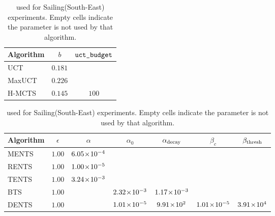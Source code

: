     \begin{table}[tbp]
        \centering
        \begin{subtable}{\textwidth}
            \centering
            \begin{tabular}{l|c|c}
                Algorithm & $b$ & ${\texttt{uct\_budget}}$ \\
                \hline
                UCT     & $0.181$ & \\
                MaxUCT  & $0.226$ & \\
                H-MCTS  & $0.145$ & $100$ \\
            \end{tabular}
            \caption{UCT-based search algorithms.}
        \end{subtable}
    
        \vspace{1em}
    
            {%
            \setlength{\tabcolsep}{4pt}%
            \fontsize{12}{14.5}\selectfont
        \begin{subtable}{\textwidth}
            \centering
            \begin{tabular}{l|c|c|c|c|c|c}
                Algorithm
                    & $\epsilon$
                    & $\alpha$
                    & $\alpha_0$
                    & ${\alpha_{\text{decay}}}$
                    & $\beta_c$
                    & ${\beta_{\text{thresh}}}$ \\
                \hline
                MENTS & $1.00$ & $6.05\!\times\!10^{-4}$ & & & & \\
                RENTS & $1.00$ & $1.00\!\times\!10^{-5}$ & & & & \\
                TENTS & $1.00$ & $3.24\!\times\!10^{-3}$ & & & & \\
                BTS   & $1.00$ & & $2.32\!\times\!10^{-3}$ & $1.17\!\times\!10^{-3}$ & & \\
                DENTS & $1.00$ & & $1.01\!\times\!10^{-5}$ & $9.91\!\times\!10^{2}$ 
                    & $1.01\!\times\!10^{-5}$ & $3.91\!\times\!10^{4}$ \\
            \end{tabular}
            \caption{Boltzmann-based search algorithms.}
        \end{subtable}
            }

        \caption[ for Sailing(South-East) experiments.]{ used for  Sailing(South-East) experiments. Empty cells indicate the parameter is not used by that algorithm.}
        \label{table:sailing_south_east_params}
    \end{table}
